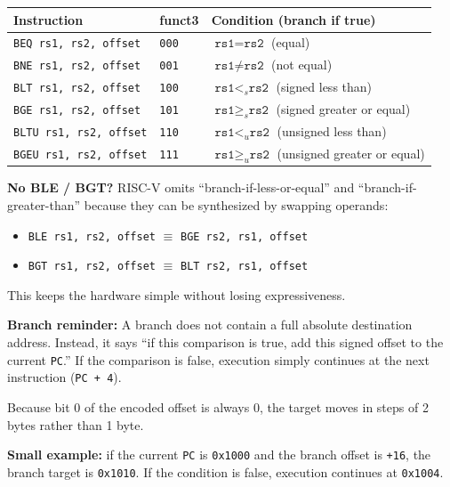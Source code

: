 \documentclass[12pt, a4paper, oneside]{book}
\begin{document}
\begin{center}
\renewcommand{\arraystretch}{1.25}
\begin{tabular}{l l p{8cm}}
\toprule
\textbf{\color{purple}Instruction} & \textbf{\color{purple}funct3} & \textbf{\color{purple}Condition (branch if true)} \\
\midrule
\texttt{BEQ  rs1, rs2, offset} & \texttt{000} & $\texttt{rs1} = \texttt{rs2}$ \hfill (equal) \\
\texttt{BNE  rs1, rs2, offset} & \texttt{001} & $\texttt{rs1} \neq \texttt{rs2}$ \hfill (not equal) \\
\texttt{BLT  rs1, rs2, offset} & \texttt{100} & $\texttt{rs1} <_s \texttt{rs2}$ \hfill (signed less than) \\
\texttt{BGE  rs1, rs2, offset} & \texttt{101} & $\texttt{rs1} \geq_s \texttt{rs2}$ \hfill (signed greater or equal) \\
\texttt{BLTU rs1, rs2, offset} & \texttt{110} & $\texttt{rs1} <_u \texttt{rs2}$ \hfill (unsigned less than) \\
\texttt{BGEU rs1, rs2, offset} & \texttt{111} & $\texttt{rs1} \geq_u \texttt{rs2}$ \hfill (unsigned greater or equal) \\
\bottomrule
\end{tabular}
\end{center}

\begin{infobox}
\textbf{\color{accentblue}No BLE / BGT?}
RISC-V omits ``branch-if-less-or-equal'' and ``branch-if-greater-than'' because they can be synthesized by swapping operands:
\begin{itemize}
  \item \texttt{BLE rs1, rs2, offset} $\equiv$ \texttt{BGE rs2, rs1, offset}
  \item \texttt{BGT rs1, rs2, offset} $\equiv$ \texttt{BLT rs2, rs1, offset}
\end{itemize}
This keeps the hardware simple without losing expressiveness.
\end{infobox}

\begin{keybox}
\textbf{\color{gold}Branch reminder:}
A branch does not contain a full absolute destination address. Instead, it says ``if this comparison is true, add this signed offset to the current \texttt{PC}.'' If the comparison is false, execution simply continues at the next instruction (\texttt{PC + 4}).

Because bit 0 of the encoded offset is always 0, the target moves in steps of 2 bytes rather than 1 byte.

\textbf{Small example:} if the current \texttt{PC} is \texttt{0x1000} and the branch offset is \texttt{+16}, the branch target is \texttt{0x1010}. If the condition is false, execution continues at \texttt{0x1004}.
\end{keybox}
\end{document}
